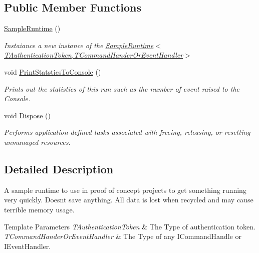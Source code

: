 \subsection*{Public Member Functions}
\begin{DoxyCompactItemize}
\item 
\hyperlink{classCqrs_1_1Configuration_1_1SampleRuntime_a9382e8b20b8701815ad20c1cd645c27b_a9382e8b20b8701815ad20c1cd645c27b}{Sample\+Runtime} ()
\begin{DoxyCompactList}\small\item\em Instaiance a new instance of the \hyperlink{classCqrs_1_1Configuration_1_1SampleRuntime_a9382e8b20b8701815ad20c1cd645c27b_a9382e8b20b8701815ad20c1cd645c27b}{Sample\+Runtime$<$\+T\+Authentication\+Token,\+T\+Command\+Hander\+Or\+Event\+Handler$>$} \end{DoxyCompactList}\item 
void \hyperlink{classCqrs_1_1Configuration_1_1SampleRuntime_a384b1c93c2d856f2d15a7ae410dedee9_a384b1c93c2d856f2d15a7ae410dedee9}{Print\+Statstics\+To\+Console} ()
\begin{DoxyCompactList}\small\item\em Prints out the statistics of this run such as the number of event raised to the Console. \end{DoxyCompactList}\item 
void \hyperlink{classCqrs_1_1Configuration_1_1SampleRuntime_ae3729c9e4d130fb2e0c88246d58dc761_ae3729c9e4d130fb2e0c88246d58dc761}{Dispose} ()
\begin{DoxyCompactList}\small\item\em Performs application-\/defined tasks associated with freeing, releasing, or resetting unmanaged resources. \end{DoxyCompactList}\end{DoxyCompactItemize}


\subsection{Detailed Description}
A sample runtime to use in proof of concept projects to get something running very quickly. Doesn\textquotesingle{}t save anything. All data is lost when recycled and may cause terrible memory usage. 


\begin{DoxyTemplParams}{Template Parameters}
{\em T\+Authentication\+Token} & The Type of authentication token.\\
\hline
{\em T\+Command\+Hander\+Or\+Event\+Handler} & The Type of any I\+Command\+Handle or I\+Event\+Handler.\\
\hline
\end{DoxyTemplParams}


